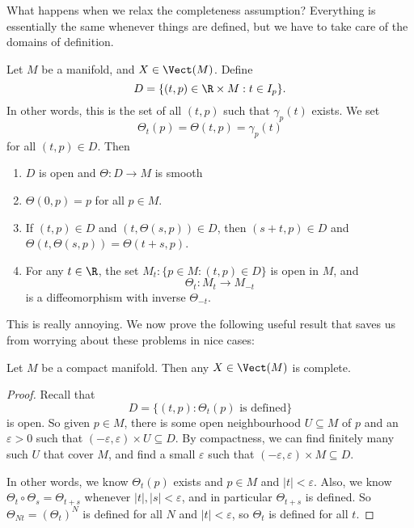 \documentclass[a4paper]{article}
\begin{document}
What happens when we relax the completeness assumption? Everything is essentially the same whenever things are defined, but we have to take care of the domains of definition.

\begin{thm}
  Let $M$ be a manifold, and $X \in \Vect(M)$. Define
  \[
    D = \{(t, p) \in \R \times M: t \in I_p\}.
  \]
  In other words, this is the set of all $(t, p)$ such that $\gamma_p(t)$ exists. We set
  \[
    \Theta_t (p) = \Theta(t, p) = \gamma_p(t)
  \]
  for all $(t, p) \in D$. Then
  \begin{enumerate}
    \item $D$ is open and $\Theta: D \to M$ is smooth
    \item $\Theta(0, p) = p$ for all $p \in M$.
    \item If $(t, p) \in D$ and $(t, \Theta(s, p)) \in D$, then $(s + t, p) \in D$ and $\Theta(t, \Theta(s, p)) = \Theta(t + s, p)$.
    \item For any $t \in \R$, the set $M_t: \{p \in M: (t, p) \in D\}$ is open in $M$, and
      \[
        \Theta_t: M_t \to M_{-t}
      \]
      is a diffeomorphism with inverse $\Theta_{-t}$.
  \end{enumerate}
\end{thm}

This is really annoying. We now prove the following useful result that saves us from worrying about these problems in nice cases:
\begin{prop}
  Let $M$ be a compact manifold. Then any $X \in \Vect(M)$ is complete.
\end{prop}

\begin{proof}
  Recall that
  \[
    D = \{(t, p): \Theta_t(p)\text{ is defined}\}
  \]
  is open. So given $p \in M$, there is some open neighbourhood $U \subseteq M$ of $p$ and an $\varepsilon > 0$ such that $(-\varepsilon, \varepsilon) \times U \subseteq D$. By compactness, we can find finitely many such $U$ that cover $M$, and find a small $\varepsilon$ such that $(-\varepsilon, \varepsilon) \times M \subseteq D$.

  In other words, we know $\Theta_t(p)$ exists and $p \in M$ and $|t| < \varepsilon$. Also, we know $\Theta_t \circ \Theta_s = \Theta_{t + s}$ whenever $|t|, |s| < \varepsilon$, and in particular $\Theta_{t + s}$ is defined. So $\Theta_{Nt} = (\Theta_t)^N$ is defined for all $N$ and $|t| < \varepsilon$, so $\Theta_t$ is defined for all $t$.
\end{proof}
\end{document}
